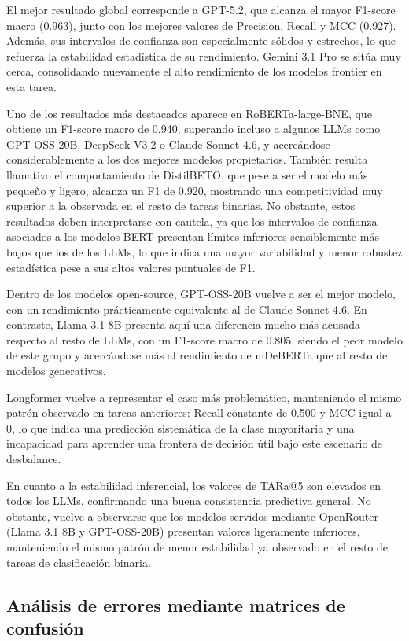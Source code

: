 El mejor resultado global corresponde a GPT-5.2, que alcanza el mayor F1-score macro (0.963), junto con los mejores valores de Precision, Recall y \ac{MCC} (0.927). Además, sus intervalos de confianza son especialmente sólidos y estrechos, lo que refuerza la estabilidad estadística de su rendimiento. Gemini 3.1 Pro se sitúa muy cerca, consolidando nuevamente el alto rendimiento de los modelos frontier en esta tarea.

Uno de los resultados más destacados aparece en RoBERTa-large-BNE, que obtiene un F1-score macro de 0.940, superando incluso a algunos \acp{LLM} como GPT-OSS-20B, DeepSeek-V3.2 o Claude Sonnet 4.6, y acercándose considerablemente a los dos mejores modelos propietarios. También resulta llamativo el comportamiento de DistilBETO, que pese a ser el modelo más pequeño y ligero, alcanza un F1 de 0.920, mostrando una competitividad muy superior a la observada en el resto de tareas binarias. No obstante, estos resultados deben interpretarse con cautela, ya que los intervalos de confianza asociados a los modelos BERT presentan límites inferiores sensiblemente más bajos que los de los \acp{LLM}, lo que indica una mayor variabilidad y menor robustez estadística pese a sus altos valores puntuales de F1.

Dentro de los modelos open-source, GPT-OSS-20B vuelve a ser el mejor modelo, con un rendimiento prácticamente equivalente al de Claude Sonnet 4.6. En contraste, Llama 3.1 8B presenta aquí una diferencia mucho más acusada respecto al resto de \acp{LLM}, con un F1-score macro de 0.805, siendo el peor modelo de este grupo y acercándose más al rendimiento de mDeBERTa que al resto de modelos generativos.

Longformer vuelve a representar el caso más problemático, manteniendo el mismo patrón observado en tareas anteriores: Recall constante de 0.500 y \ac{MCC} igual a 0, lo que indica una predicción sistemática de la clase mayoritaria y una incapacidad para aprender una frontera de decisión útil bajo este escenario de desbalance.

En cuanto a la estabilidad inferencial, los valores de \ac{TARa@5} son elevados en todos los \acp{LLM}, confirmando una buena consistencia predictiva general. No obstante, vuelve a observarse que los modelos servidos mediante OpenRouter (Llama 3.1 8B y GPT-OSS-20B) presentan valores ligeramente inferiores, manteniendo el mismo patrón de menor estabilidad ya observado en el resto de tareas de clasificación binaria.

\subsection{Análisis de errores mediante matrices de confusión}

